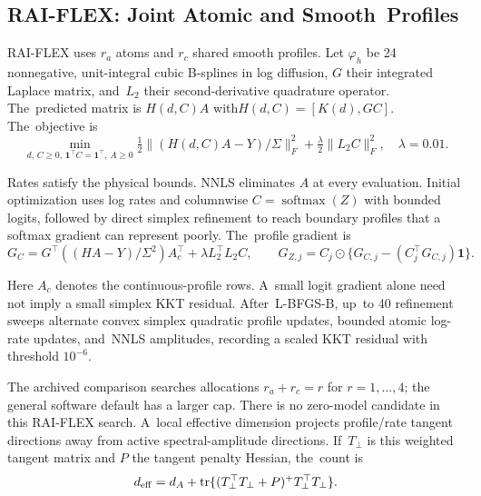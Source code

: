 \documentclass[mathematics,article,accept,moreauthors]{Definitions/mdpi}
\newcommand{\one}{\mathbf{1}}
\newcommand{\tr}{\operatorname{tr}}
\begin{document}

\subsection{RAI-FLEX: Joint Atomic and Smooth~Profiles}\label{app:raiflex}
RAI-FLEX uses $r_a$ atoms and $r_c$ shared smooth profiles. Let $\varphi_h$ be 24 nonnegative, unit-integral cubic B-splines in log diffusion, $G$ their integrated Laplace matrix, and~$L_2$ their second-derivative quadrature operator. The~predicted matrix is $H(d,C)A$ with\linebreak   $H(d,C)=[K(d),GC]$. The~objective is
\begin{equation}\label{eq:raiflex}
 \min_{d,\,C\geq0,\,\one^\top C=\one^\top,\,A\geq0}
 \tfrac12\|(H(d,C)A-Y)/\Sigma\|_F^2+\tfrac\lambda2\|L_2C\|_F^2,
 \quad \lambda=0.01.
\end{equation}

Rates satisfy the physical bounds. NNLS eliminates $A$ at every evaluation. Initial optimization uses log rates and columnwise $C=\operatorname{softmax}(Z)$ with bounded logits, followed by direct simplex refinement to reach boundary profiles that a softmax gradient can represent poorly. The~profile gradient is
\begin{equation}\label{eq:flexgrad}
 G_C=G^\top((HA-Y)/\Sigma^2)A_c^\top+\lambda L_2^\top L_2C,
 \qquad G_{Z,j}=C_j\odot\{G_{C,j}-(C_j^\top G_{C,j})\one\}.
\end{equation}

Here $A_c$ denotes the continuous-profile rows. A~small logit gradient alone need not imply a small simplex KKT residual. After~L-BFGS-B, up~to 40 refinement sweeps alternate convex simplex quadratic profile updates, bounded atomic log-rate updates, and~NNLS amplitudes, recording a scaled KKT residual with threshold $10^{-6}$.

The archived comparison searches allocations $r_a+r_c=r$ for $r=1,\ldots,4$; the general software default has a larger cap. There is no zero-model candidate in this RAI-FLEX search. A~local effective dimension projects profile/rate tangent directions away from active spectral-amplitude directions. If~$T_\perp$ is this weighted tangent matrix and $P$ the tangent penalty Hessian, the~count is
\begin{equation}\label{eq:flexdf}
 d_{\rm eff}=d_A+\tr\{(T_\perp^\top T_\perp+P)^+
                                      T_\perp^\top T_\perp\}.
\end{equation}
\end{document}
